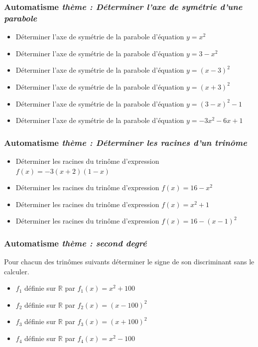 \documentclass[11pt]{beamer}
\newcommand{\R}{\mathbb{R}}
\newcounter{autocompteur}
\newcommand{\automatisme}[1]{\addtocounter{autocompteur}{1}\frametitle{Automatisme  \theautocompteur  \textit{ thème : #1}}}
\begin{document}
\begin{frame}
\automatisme{Déterminer l'axe de symétrie d'une parabole}


\begin{itemize}
\item Déterminer l'axe de symétrie de la parabole d'équation $y=x^{2}$
\item Déterminer l'axe de symétrie de la parabole d'équation $y=3-x^{2}$
\item Déterminer l'axe de symétrie de la parabole d'équation $y=(x-3)^{2}$
\item Déterminer l'axe de symétrie de la parabole d'équation $y=(x+3)^{2}$
\item Déterminer l'axe de symétrie de la parabole d'équation $y=(3-x)^{2}-1$
\item Déterminer l'axe de symétrie de la parabole d'équation $y=-3x^{2}-6x+1$
\end{itemize}

\end{frame}


\begin{frame}
\automatisme{Déterminer les racines d'un trinôme}


\begin{itemize}
\item Déterminer les racines du trinôme d'expression $f(x)=-3(x+2)(1-x)$
\item Déterminer les racines du trinôme d'expression $f(x)=16-x^{2}$
\item Déterminer les racines du trinôme d'expression $f(x)=x^{2}+1$
\item Déterminer les racines du trinôme d'expression $f(x)=16-(x-1)^{2}$
\end{itemize}

\end{frame}



\begin{frame}
\automatisme{second degré}

Pour chacun des trinômes suivants déterminer le signe de son discriminant sans le calculer.
\begin{itemize}
\item $f_{1}$ définie sur $\R$ par $f_{1}(x)=x^2+100$
\item $f_{2}$ définie sur $\R$ par $f_{2}(x)=(x-100)^2$
\item $f_{3}$ définie sur $\R$ par $f_{3}(x)=(x+100)^2$
\item $f_{4}$ définie sur $\R$ par $f_{4}(x)=x^2-100$
\end{itemize}

\end{frame}
\end{document}
